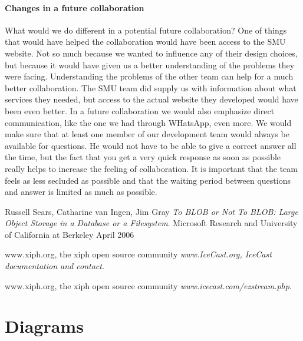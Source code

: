 \documentclass[a4paper,11pt,report]{article}
\begin{document}
{\paragraph{Changes in a future collaboration}
What would we do different in a potential future collaboration? One of things that would have helped the collaboration would have been access to the SMU website. Not so much because we wanted to influence any of their design choices, but because it would have given us a better understanding of the problems they were facing. Understanding the problems of the other team can help for a much better collaboration. The SMU team did supply us with information about what services they needed, but access to the actual website they developed would have been even better. In a future collaboration we would also emphasize direct communication, like the one we had through WHatsApp, even more. We would make sure that at least one member of our development team would always be available for questions. He would not have to be able to give a correct answer all the time, but the fact that you get a very quick response as soon as possible really helps to increase the feeling of collaboration. It is important that the team feels as less secluded as possible and that the waiting period between questions and answer is limited as much as possible. 

\begin{thebibliography}{9}
  Russell Sears, Catharine van Ingen, Jim Gray
  \emph{To BLOB or Not To BLOB: 
Large Object Storage in a Database or a Filesystem}.
  Microsoft Research and University of California at Berkeley
  April 2006
  
  www.xiph.org, the xiph open source community
  \emph{www.IceCast.org, IceCast documentation and contact}.
    
  www.xiph.org, the xiph open source community
  \emph{www.icecast.com/ezstream.php}.
\end{thebibliography}
\newpage
\appendix
\section{Diagrams}

}
\end{document}
